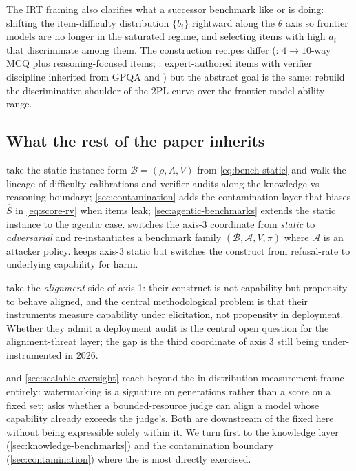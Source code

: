 The IRT framing also clarifies what a successor benchmark like
 \citep{wang2024-mmlu-pro} or  \citep{phan2025-hle} is
doing: shifting the item-difficulty distribution $\{b_i\}$ rightward
along the $\theta$ axis so frontier models are no longer in the
saturated regime, and selecting items with high $a_i$ that
discriminate among them. The construction recipes differ
(: $4 \to 10$-way MCQ plus reasoning-focused items; :
expert-authored items with verifier discipline inherited from
GPQA and ) but the abstract goal is the same: rebuild
the discriminative shoulder of the 2PL curve over the frontier-model
ability range. 

\subsection{What the rest of the paper inherits}
\label{sec:measuring-handoff}

 take the
static-instance form $\mathcal{B} = (\rho, A, V)$ from
\eqref{eq:bench-static} and walk the lineage of difficulty
calibrations and verifier audits along the knowledge-vs-reasoning
boundary; \cref{sec:contamination} adds the contamination layer that
biases $\hat{S}$ in \eqref{eq:score-rv} when items leak;
\cref{sec:agentic-benchmarks} extends the static instance to the
agentic case.  switches the axis-3
coordinate from \emph{static} to \emph{adversarial} and re-instantiates
a benchmark family $(\mathcal{B}, \mathcal{A}, V, \pi)$ where
$\mathcal{A}$ is an attacker policy.
 keeps axis-3 static but switches the
construct from refusal-rate to underlying capability for harm.

 take the
\emph{alignment} side of axis 1: their construct is not capability
but propensity to behave aligned, and the central methodological
problem is that their instruments measure capability under
elicitation, not propensity in deployment. Whether they admit a
deployment audit is the central open question for the
alignment-threat layer; the gap is the third coordinate of axis 3
still being under-instrumented in 2026.

 and \cref{sec:scalable-oversight} reach
beyond the in-distribution measurement frame entirely: watermarking
is a signature on generations rather than a score on a fixed set;
 asks whether a bounded-resource judge can align a
model whose capability already exceeds the judge's. Both are
downstream of the  fixed here without being expressible
solely within it. We turn first to the knowledge layer
(\cref{sec:knowledge-benchmarks}) and the contamination boundary
(\cref{sec:contamination}) where the  is most directly
exercised.
